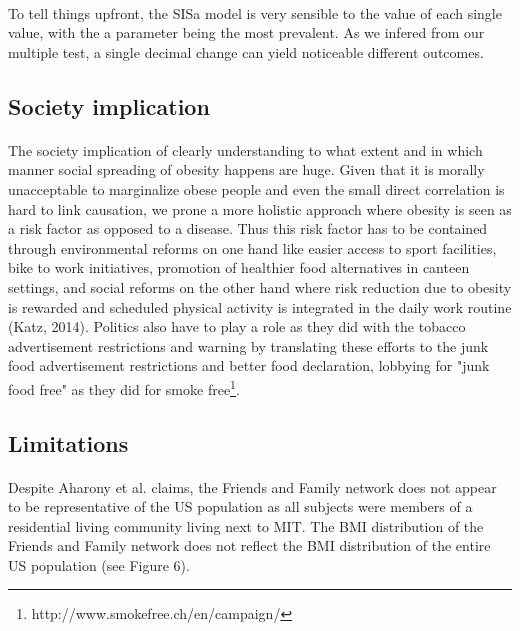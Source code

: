 \documentclass[11pt]{article}
\begin{document}
\paragraph{}
To tell things upfront, the SISa model is very sensible to the value of each single value, with the a parameter being the most prevalent. As we infered from our multiple test, a single decimal change can yield noticeable different outcomes.



\subsection{Society implication}
\paragraph{}
The society implication of clearly understanding to what extent and in which manner social spreading of obesity happens are huge. Given that it is morally unacceptable to marginalize obese people and even the small direct correlation is hard to link causation, we prone a more holistic approach where obesity is seen as a risk factor as opposed to a disease. Thus this risk factor has to be contained through environmental reforms on one hand like easier access to sport facilities, bike to work initiatives, promotion of healthier food alternatives in canteen settings, and social reforms on the other hand where risk reduction due to obesity is rewarded and scheduled physical activity is integrated in the daily work routine (Katz, 2014). Politics also have to play a role as they did with the tobacco advertisement restrictions and warning by translating these efforts to the junk food advertisement restrictions and better food declaration, lobbying for "junk food free" as they did for smoke free\footnote{http://www.smokefree.ch/en/campaign/}.

\subsection{Limitations}
\paragraph{}
Despite Aharony et al. claims, the Friends and Family network does not appear to be representative of the US population as all subjects were members of a residential living community living next to MIT. The BMI distribution of the Friends and Family network does not reflect the BMI distribution of the entire US population (see Figure 6).
\end{document}
